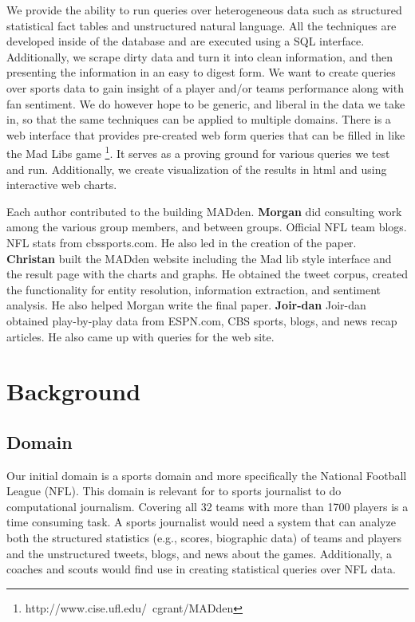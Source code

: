 \documentclass[11pt,onecolumn]{article}
\newcommand{\system}{MADden\xspace}
\begin{document}
    We provide the ability to run queries over heterogeneous data such as structured statistical 
		fact tables and unstructured natural language. All the techniques are 
developed inside of the database and are executed using a SQL interface.
    Additionally, we  scrape dirty data and turn it into clean information, and then presenting 
		the information in an easy to digest form.
    We want to create queries over sports data to gain insight of a player and/or teams
		performance along with fan sentiment.
    We do however hope to be generic, and liberal in the data we take in, so that the same techniques can be applied to multiple domains.
    There is a web interface that provides pre-created web form queries that can be filled in 
		like the Mad Libs game \footnote{http://www.cise.ufl.edu/~cgrant/MADden}.
    It serves as a proving ground for various queries we test and run.
		Additionally, we create visualization of the results in html and using
interactive web charts.


Each author contributed to the building \system.
   \textbf{Morgan} did consulting work among the various group members, and between groups.
    Official NFL team blogs. NFL stats from cbssports.com. He also led in the creation of the paper.
		\textbf{Christan} built the \system website including the Mad lib style interface and the 
		result page with the charts and graphs. He obtained the tweet corpus, created the functionality
		for entity resolution, information extraction, and sentiment analysis. He also helped Morgan
		write the final paper.
		\textbf{Joir-dan} Joir-dan obtained play-by-play data from ESPN.com, CBS sports, blogs,
		and news recap articles.
		He also came up with queries for the web site.


  \section{Background}
  \subsection{Domain}

  Our initial domain is a sports domain and more specifically the National Football League (NFL).
  This domain is relevant for to sports journalist to do computational journalism.
  Covering all 32 teams with more than 1700 players is a time consuming task.
  A sports journalist would need a system
  that can analyze both the
  structured statistics (e.g., scores, biographic data) of teams and players and the
  unstructured tweets, blogs, and news about the games.
	Additionally, a coaches and scouts would find use in creating statistical queries over NFL data.
\end{document}
